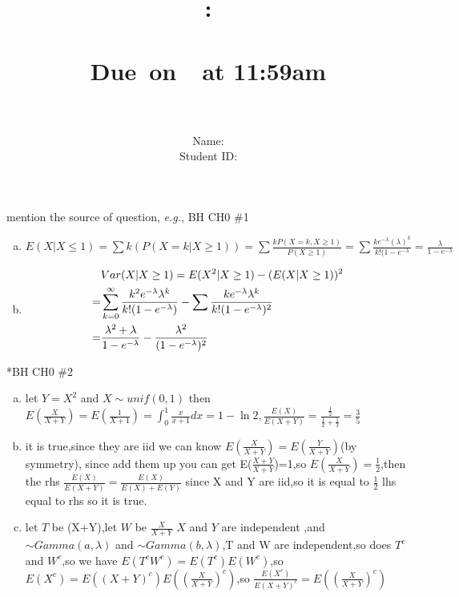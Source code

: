 \documentclass{article}
\title{
    \vspace{2in}
    \textmd{\textbf{\hmwkClass:\\  \hmwkTitle}}\\
    \normalsize\vspace{0.1in}\small{Due\ on\ \hmwkDueDate\ at 11:59am}\\
   \vspace{2in}\Huge{\hmwkClassID}\\   
   \vspace{2in}
}
\author{
	Name: \textbf{\hmwkAuthorName} \\
	Student ID: \hmwkAuthorID}
\date{}
\begin{document}
\maketitle
\pagebreak

\begin{homeworkProblem}{{\color{blue}mention the source of question}, \textit{e.g.}, BH CH0 \#1}
\begin{enumerate}[(a)]
	\item $E(X|X\leq 1)=\sum k(P(X=k|X\geq 1))=\sum\frac{kP(X=k,X\geq 1)}{P(X\geq 1)}=\sum\frac{ke^{-\lambda }(\lambda)^{k}}{k!(1-e^{-\lambda}}=\frac{\lambda}{1-e^{-\lambda}}$
	\item \begin{equation}
	\begin{aligned}
	&Var(X|X\geq 1)=E(X^{2}|X\geq 1)-(E(X|X\geq 1))^{2}\\ \notag
	=&\sum_{k=0}^{\infty}\frac{k^{2}e^{-\lambda}\lambda^{k}}{k!(1-e^{-\lambda})}-\sum\frac{ke^{-\lambda}\lambda^{k}}{k!(1-e^{-\lambda})^{2}}
	\\=&\frac{\lambda^{2}+\lambda}{1-e^{-\lambda}}-\frac{\lambda^{2}}{(1-e^{-\lambda})^{2}}
	\end{aligned}
\end{equation}
\end{enumerate}
	
\end{homeworkProblem}

\begin{homeworkProblem}*{BH CH0 \#2}
	\begin{enumerate}[(a)]
\item let $Y=X^{2}$ and $X\sim unif(0,1)$ then $E(\frac{X}{X+Y})=E(\frac{1}{X+1})=\int_{0}^{1}\frac{x}{x+1}dx=1-\ln 2$$,\frac{E(X)}{E(X+Y)}=\frac{\frac{1}{2}}{\frac{1}{2}+\frac{1}{3}}=\frac{3}{5}$		
\item it is true,since they are iid we can know $E(\frac{X}{X+Y})=E(\frac{Y}{X+Y})$(by symmetry), since add them up you can get E($\frac{X+Y}{X+Y}$)=1,so $E(\frac{X}{X+Y})=\frac{1}{2}$,then the rhs $\frac{E(X)}{E(X+Y)}=\frac{E(X)}{E(X)+E(Y)}$ since X and Y are iid,so it is equal to  $\frac{1}{2}$ lhs equal to rhs so it is true.
\item let $T$ be  (X+Y),let $W$ be $\frac{X}{X+Y}$  $X$ and $Y$ are independent ,and $\sim Gamma(a,\lambda)$ and $\sim Gamma(b,\lambda)$,T and W are independent,so does $T^{c}$ and $W^{c}$,so we have $E(T^{c}W^{c})=E(T^{c})E(W^{c})$,so $E(X^{c})=E((X+Y)^{c})E((\frac{X}{X+Y})^{c})$,so $\frac{E(X^{c})}{E(X+Y)^{c}}=E((\frac{X}{X+Y})^{c})$ 
\end{enumerate}

\end{homeworkProblem}
\end{document}
